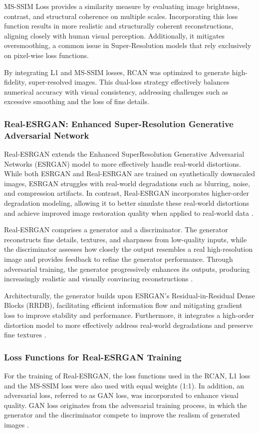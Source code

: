 \documentclass[10pt,twocolumn]{article}
\begin{document}
MS-SSIM Loss provides a similarity measure by evaluating image brightness, contrast, and structural coherence on multiple scales. Incorporating this loss function results in more realistic and structurally coherent reconstructions, aligning closely with human visual perception. Additionally, it mitigates oversmoothing, a common issue in Super-Resolution models that rely exclusively on pixel-wise loss functions\cite{Arezoomand2021}.

By integrating L1 and MS-SSIM losses, RCAN was optimized to generate high-fidelity, super-resolved images. This dual-loss strategy effectively balances numerical accuracy with visual consistency, addressing challenges such as excessive smoothing and the loss of fine details.

\subsubsection{Real-ESRGAN: Enhanced Super-Resolution Generative Adversarial Network}
Real-ESRGAN extends the Enhanced SuperResolution Generative Adversarial Networks (ESRGAN) model to more effectively handle real-world distortions. While both ESRGAN and Real-ESRGAN are trained on synthetically downscaled images, ESRGAN struggles with real-world degradations such as blurring, noise, and compression artifacts. In contrast, Real-ESRGAN incorporates higher-order degradation modeling, allowing it to better simulate these real-world distortions and achieve improved image restoration quality when applied to real-world data \cite{Wang2021}.

Real-ESRGAN comprises a generator and a discriminator. The generator reconstructs fine details, textures, and sharpness from low-quality inputs, while the discriminator assesses how closely the output resembles a real high-resolution image and provides feedback to refine the generator performance. Through adversarial training, the generator progressively enhances its outputs, producing increasingly realistic and visually convincing reconstructions \cite{Wang2021}.

Architecturally, the generator builds upon ESRGAN’s Residual-in-Residual Dense Blocks (RRDB), facilitating efficient information flow and mitigating gradient loss to improve stability and performance. Furthermore, it integrates a high-order distortion model to more effectively address real-world degradations and preserve fine textures \cite{Wang2021}.

\subsubsection{Loss Functions for Real-ESRGAN Training}
For the training of Real-ESRGAN, the loss functions used in the RCAN, L1 loss and the MS-SSIM loss were also used with equal weights (1:1). In addition, an adversarial loss, referred to as GAN loss, was incorporated to enhance visual quality. GAN loss originates from the adversarial training process, in which the generator and the discriminator compete to improve the realism of generated images \cite{Goodfellow2014}.
\end{document}
